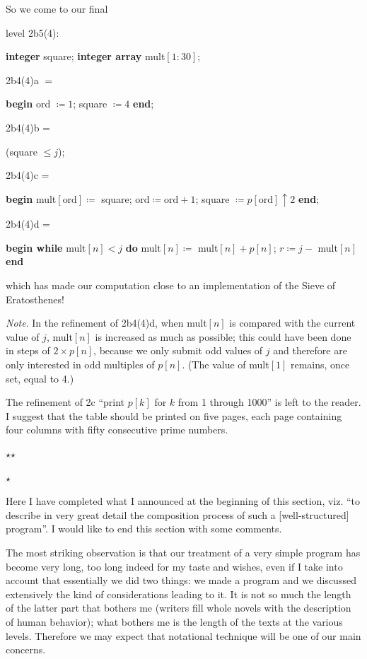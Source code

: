 \documentclass[twoside,11pt]{book}
\begin{document}
So we come to our final

\noindent
level 2b5(4):

\noindent
\textbf{integer} square; \textbf{integer array} mult$[1 : 30]$;

\noindent
2b4(4)a $=$

\noindent
\textbf{begin} ord $\coloneq 1$; square $\coloneq 4$ \textbf{end};

\noindent
2b4(4)b =

\noindent
\quad (square $\leqslant j$);

\noindent
2b4(4)c =

\noindent
\textbf{begin} mult$[\text{ord}] \coloneq$ square; $\text{ord} \coloneq \text{ord} + 1$; square $\coloneq p[\text{ord}] \uparrow 2$ \textbf{end};

\noindent
2b4(4)d =

\noindent
\textbf{begin while} mult$[n] < j$ \textbf{do} mult$[n]\coloneq$ mult$[n] + p[n]$; $r\coloneq j -$ mult$[n]$ \textbf{end}

\noindent
which has made our computation close to an implementation of the Sieve of Eratosthenes!

\noindent
\textit{Note}. In the refinement of 2b4(4)d, when mult$[n]$ is compared with the current value of $j$, mult$[n]$ is increased as much as possible; this could have been done in steps of $2\times p[n]$, because we only submit odd values of $j$ and therefore are only interested in odd multiples of $p[n]$. (The value of mult$[1]$ remains, once set, equal to 4.)

The refinement of 2c ``print $p[k]$ for $k$ from 1 through 1000'' is left to the reader. I suggest that the table should be printed on five pages, each page containing four columns with fifty consecutive prime numbers.

\vspace*{-1em}
\begin{center}
	$\star$\quad\quad  $\star$\\
	\nopagebreak
	
	\vspace*{-.5em}
	$\star$
\end{center}
\vspace*{-1em}

Here I have completed what I announced at the beginning of this section, viz. ``to describe in very great detail the composition process of such a [well-structured] program''. I would like to end this section with some comments.

The most striking observation is that our treatment of a very simple program has become very long, too long indeed for my taste and wishes, even if I take into account that essentially we did two things: we made a program and we discussed extensively the kind of considerations leading to it. It is not so much the length of the latter part that bothers me (writers fill whole novels with the description of human behavior); what bothers me is the length of the texts at the various levels. Therefore we may expect that notational technique will be one of our main concerns.
\end{document}
